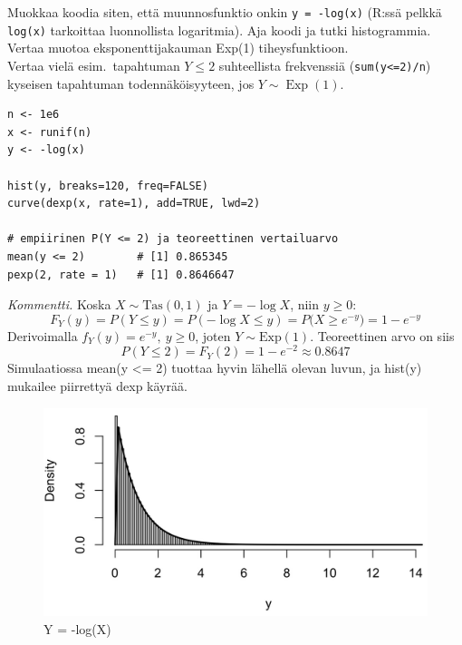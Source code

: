 \documentclass[12pt,a4paper]{article}
\begin{document}
\begin{kohta}

\pagebreak
\item Muokkaa koodia siten, että muunnosfunktio onkin \texttt{y =
-log(x)} (R:ssä pelkkä \texttt{log(x)} tarkoittaa luonnollista logaritmia).
Aja koodi ja tutki histogrammia.\\[6pt]
Vertaa muotoa eksponenttijakauman Exp(1) tiheysfunktioon.\\[6pt]
Vertaa vielä esim.\ tapahtuman $Y\leq 2$ suhteellista frekvenssiä
(\texttt{sum(y<=2)/n}) kyseisen tapahtuman todennäköisyyteen, jos
$Y\sim\operatorname{Exp}(1)$.

\begin{verbatim}
n <- 1e6
x <- runif(n)
y <- -log(x)

hist(y, breaks=120, freq=FALSE)
curve(dexp(x, rate=1), add=TRUE, lwd=2)

# empiirinen P(Y <= 2) ja teoreettinen vertailuarvo
mean(y <= 2)        # [1] 0.865345
pexp(2, rate = 1)   # [1] 0.8646647
\end{verbatim}

\textit{Kommentti.} Koska $X\sim\mathrm{Tas}(0,1)$ ja $Y=-\log X$, niin $y\ge0$:
\[
F_Y(y)=P(Y\le y)=P(-\log X\le y)=P\!\big(X\ge e^{-y}\big)
=1-e^{-y}
\]
Derivoimalla $f_Y(y)=e^{-y},\ y\ge0$, joten $Y\sim\mathrm{Exp}(1)$.
Teoreettinen arvo on siis
\[
P(Y\le 2)=F_Y(2)=1-e^{-2}\approx 0.8647
\]
Simulaatiossa mean(y <= 2) tuottaa hyvin lähellä olevan luvun, ja
hist(y) mukailee piirrettyä dexp käyrää.

\begin{figure}[h]
  \centering
  \includegraphics[width=.8\textwidth]{viikko5tehtävä9.jpg}
  \caption{Y = -log(X)}
\end{figure}

\end{kohta}
\end{document}
